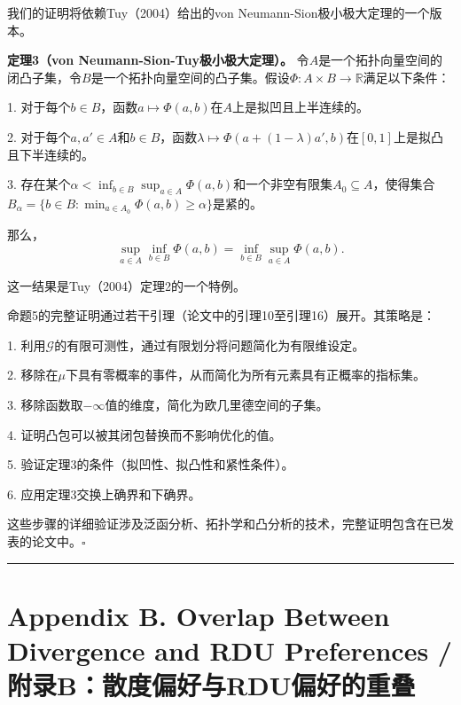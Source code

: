 \documentclass[12pt,a4paper]{article}
\newenvironment{translation}
  {\par\noindent\color{blue!70!black}\smallskip}
  {\par\medskip\hrule\medskip}
\begin{document}
\begin{translation}
我们的证明将依赖Tuy（2004）给出的von Neumann-Sion极小极大定理的一个版本。

\textbf{定理3（von Neumann-Sion-Tuy极小极大定理）。} 令$A$是一个拓扑向量空间的闭凸子集，令$B$是一个拓扑向量空间的凸子集。假设$\Phi: A \times B \to \mathbb{R}$满足以下条件：

1. 对于每个$b \in B$，函数$a \mapsto \Phi(a, b)$在$A$上是拟凹且上半连续的。

2. 对于每个$a, a' \in A$和$b \in B$，函数$\lambda \mapsto \Phi(a + (1-\lambda)a', b)$在$[0, 1]$上是拟凸且下半连续的。

3. 存在某个$\alpha < \inf_{b \in B} \sup_{a \in A} \Phi(a, b)$和一个非空有限集$A_0 \subseteq A$，使得集合$B_\alpha = \{ b \in B : \min_{a \in A_0} \Phi(a, b) \geq \alpha \}$是紧的。

那么，
\[
\sup_{a \in A} \inf_{b \in B} \Phi(a, b) = \inf_{b \in B} \sup_{a \in A} \Phi(a, b).
\]

这一结果是Tuy（2004）定理2的一个特例。

命题5的完整证明通过若干引理（论文中的引理10至引理16）展开。其策略是：

1. 利用$\mathcal{G}$的有限可测性，通过有限划分将问题简化为有限维设定。

2. 移除在$\mu$下具有零概率的事件，从而简化为所有元素具有正概率的指标集。

3. 移除函数取$-\infty$值的维度，简化为欧几里德空间的子集。

4. 证明凸包可以被其闭包替换而不影响优化的值。

5. 验证定理3的条件（拟凹性、拟凸性和紧性条件）。

6. 应用定理3交换上确界和下确界。

这些步骤的详细验证涉及泛函分析、拓扑学和凸分析的技术，完整证明包含在已发表的论文中。$\square$
\end{translation}

\newpage
\section*{Appendix B. Overlap Between Divergence and RDU Preferences / 附录B：散度偏好与RDU偏好的重叠}
\end{document}
